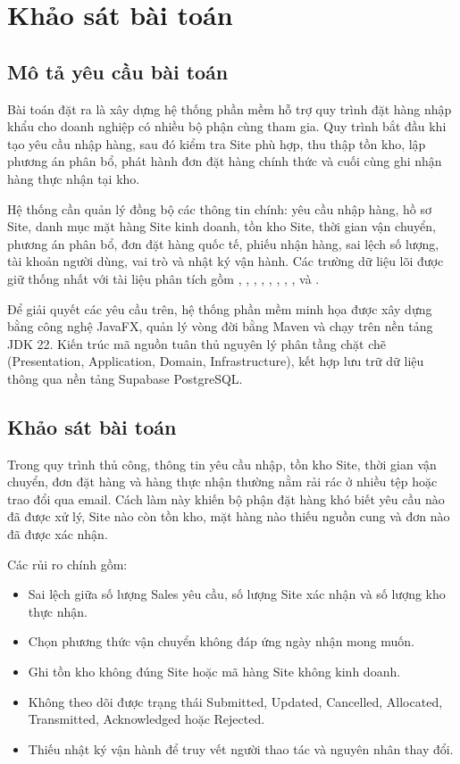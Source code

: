 \chapter{Khảo sát bài toán}

\section{Mô tả yêu cầu bài toán}

Bài toán đặt ra là xây dựng hệ thống phần mềm hỗ trợ quy trình đặt hàng nhập khẩu cho doanh nghiệp có nhiều bộ phận cùng tham gia. Quy trình bắt đầu khi  tạo yêu cầu nhập hàng, sau đó  kiểm tra Site phù hợp, thu thập tồn kho, lập phương án phân bổ, phát hành đơn đặt hàng chính thức và cuối cùng  ghi nhận hàng thực nhận tại kho.

Hệ thống cần quản lý đồng bộ các thông tin chính: yêu cầu nhập hàng, hồ sơ Site, danh mục mặt hàng Site kinh doanh, tồn kho Site, thời gian vận chuyển, phương án phân bổ, đơn đặt hàng quốc tế, phiếu nhận hàng, sai lệch số lượng, tài khoản người dùng, vai trò và nhật ký vận hành. Các trường dữ liệu lõi được giữ thống nhất với tài liệu phân tích gồm , , , , , , , ,  và .

Để giải quyết các yêu cầu trên, hệ thống phần mềm minh họa được xây dựng bằng công nghệ JavaFX, quản lý vòng đời bằng Maven và chạy trên nền tảng JDK 22. Kiến trúc mã nguồn tuân thủ nguyên lý phân tầng chặt chẽ (Presentation, Application, Domain, Infrastructure), kết hợp lưu trữ dữ liệu thông qua nền tảng Supabase PostgreSQL.

\section{Khảo sát bài toán}

Trong quy trình thủ công, thông tin yêu cầu nhập, tồn kho Site, thời gian vận chuyển, đơn đặt hàng và hàng thực nhận thường nằm rải rác ở nhiều tệp hoặc trao đổi qua email. Cách làm này khiến bộ phận đặt hàng khó biết yêu cầu nào đã được xử lý, Site nào còn tồn kho, mặt hàng nào thiếu nguồn cung và đơn nào đã được xác nhận.

Các rủi ro chính gồm:
\begin{itemize}
  \item Sai lệch giữa số lượng Sales yêu cầu, số lượng Site xác nhận và số lượng kho thực nhận.
  \item Chọn phương thức vận chuyển không đáp ứng ngày nhận mong muốn.
  \item Ghi tồn kho không đúng Site hoặc mã hàng Site không kinh doanh.
  \item Không theo dõi được trạng thái Submitted, Updated, Cancelled, Allocated, Transmitted, Acknowledged hoặc Rejected.
  \item Thiếu nhật ký vận hành để truy vết người thao tác và nguyên nhân thay đổi.
\end{itemize}


